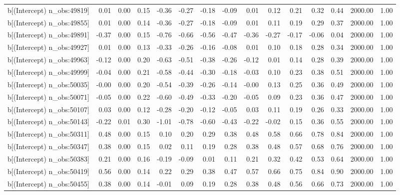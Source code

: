 \begin{table}[ht]
\begin{tabular}{rrrrrrrrrrrrrrr}
  b[(Intercept) n\_obs:49819] & 0.01 & 0.00 & 0.15 & -0.36 & -0.27 & -0.18 & -0.09 & 0.01 & 0.12 & 0.21 & 0.32 & 0.44 & 2000.00 & 1.00 \\ 
  b[(Intercept) n\_obs:49855] & 0.01 & 0.00 & 0.14 & -0.36 & -0.27 & -0.18 & -0.09 & 0.01 & 0.11 & 0.19 & 0.29 & 0.37 & 2000.00 & 1.00 \\ 
  b[(Intercept) n\_obs:49891] & -0.37 & 0.00 & 0.15 & -0.76 & -0.66 & -0.56 & -0.47 & -0.36 & -0.27 & -0.17 & -0.06 & 0.04 & 2000.00 & 1.00 \\ 
  b[(Intercept) n\_obs:49927] & 0.01 & 0.00 & 0.13 & -0.33 & -0.26 & -0.16 & -0.08 & 0.01 & 0.10 & 0.18 & 0.28 & 0.34 & 2000.00 & 1.00 \\ 
  b[(Intercept) n\_obs:49963] & -0.12 & 0.00 & 0.20 & -0.63 & -0.51 & -0.38 & -0.26 & -0.12 & 0.01 & 0.14 & 0.28 & 0.39 & 2000.00 & 1.00 \\ 
  b[(Intercept) n\_obs:49999] & -0.04 & 0.00 & 0.21 & -0.58 & -0.44 & -0.30 & -0.18 & -0.03 & 0.10 & 0.23 & 0.38 & 0.51 & 2000.00 & 1.00 \\ 
  b[(Intercept) n\_obs:50035] & -0.00 & 0.00 & 0.20 & -0.54 & -0.39 & -0.26 & -0.14 & -0.00 & 0.13 & 0.25 & 0.36 & 0.49 & 2000.00 & 1.00 \\ 
  b[(Intercept) n\_obs:50071] & -0.05 & 0.00 & 0.22 & -0.60 & -0.49 & -0.33 & -0.20 & -0.05 & 0.09 & 0.23 & 0.36 & 0.47 & 2000.00 & 1.00 \\ 
  b[(Intercept) n\_obs:50107] & 0.03 & 0.00 & 0.12 & -0.28 & -0.20 & -0.12 & -0.05 & 0.03 & 0.11 & 0.19 & 0.26 & 0.33 & 2000.00 & 1.00 \\ 
  b[(Intercept) n\_obs:50143] & -0.22 & 0.01 & 0.30 & -1.01 & -0.78 & -0.60 & -0.43 & -0.22 & -0.02 & 0.15 & 0.36 & 0.55 & 2000.00 & 1.00 \\ 
  b[(Intercept) n\_obs:50311] & 0.48 & 0.00 & 0.15 & 0.10 & 0.20 & 0.29 & 0.38 & 0.48 & 0.58 & 0.66 & 0.78 & 0.84 & 2000.00 & 1.00 \\ 
  b[(Intercept) n\_obs:50347] & 0.38 & 0.00 & 0.15 & 0.02 & 0.11 & 0.19 & 0.28 & 0.38 & 0.48 & 0.57 & 0.68 & 0.76 & 2000.00 & 1.00 \\ 
  b[(Intercept) n\_obs:50383] & 0.21 & 0.00 & 0.16 & -0.19 & -0.09 & 0.01 & 0.11 & 0.21 & 0.32 & 0.42 & 0.53 & 0.64 & 2000.00 & 1.00 \\ 
  b[(Intercept) n\_obs:50419] & 0.56 & 0.00 & 0.14 & 0.22 & 0.29 & 0.38 & 0.47 & 0.57 & 0.66 & 0.75 & 0.84 & 0.90 & 2000.00 & 1.00 \\ 
  b[(Intercept) n\_obs:50455] & 0.38 & 0.00 & 0.14 & -0.01 & 0.09 & 0.19 & 0.28 & 0.38 & 0.48 & 0.56 & 0.66 & 0.73 & 2000.00 & 1.00 \\ 

\end{tabular}
\end{table}
